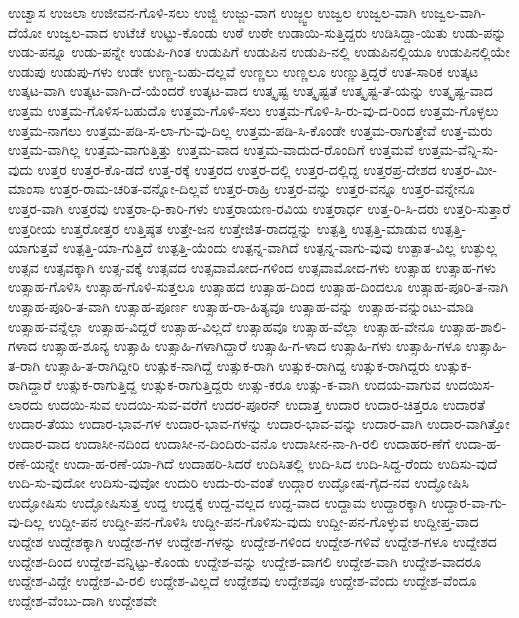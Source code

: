 {ಉಚ್ವಾಸ
ಉಜಲಾ
ಉಜೀವನ-ಗೊಳಿ-ಸಲು
ಉಜ್ಜಿ
ಉಜ್ಜು-ವಾಗ
ಉಜ್ಜ್ವಲ
ಉಜ್ವಲ
ಉಜ್ವಲ-ವಾಗಿ
ಉಜ್ವಲ-ವಾಗಿ-ದೆಯೋ
ಉಜ್ವಲ-ವಾದ
ಉಟೆಚೆ
ಉಟ್ಟು-ಕೊಂಡು
ಉಠೆ
ಉಠೇ
ಉಡಾಯಿ-ಸುತ್ತಿದ್ದರು
ಉಡಿಸಿದ್ದಾ-ಯಿತು
ಉಡು-ಪನ್ನು
ಉಡು-ಪನ್ನೂ
ಉಡು-ಪನ್ನೇ
ಉಡುಪಿ-ಗಿಂತ
ಉಡುಪಿಗೆ
ಉಡುಪಿನ
ಉಡುಪಿ-ನಲ್ಲಿ
ಉಡುಪಿನಲ್ಲಿಯೂ
ಉಡುಪಿನಲ್ಲಿಯೇ
ಉಡುಪು
ಉಡುಪು-ಗಳು
ಉಡೇ
ಉಣ್ಣ-ಬಹು-ದಲ್ಲವೆ
ಉಣ್ಣಲು
ಉಣ್ಣಲೂ
ಉಣ್ಣುತ್ತಿದ್ದರೆ
ಉತ-ಸಾರಿಕ
ಉತ್ಕಟ
ಉತ್ಕಟ-ವಾಗಿ
ಉತ್ಕಟ-ವಾಗಿ-ದೆ-ಯೆಂದರೆ
ಉತ್ಕಟ-ವಾದ
ಉತ್ಕೃಷ್ಟ
ಉತ್ಕೃಷ್ಟತೆ
ಉತ್ಕೃಷ್ಟ-ತೆ-ಯನ್ನು
ಉತ್ಕೃಷ್ಟ-ವಾದ
ಉತ್ತಮ
ಉತ್ತಮ-ಗೊಳಿಸ-ಬಹುದೊ
ಉತ್ತಮ-ಗೊಳಿ-ಸಲು
ಉತ್ತಮ-ಗೊಳಿ-ಸಿ-ರು-ವು-ದ-ರಿಂದ
ಉತ್ತಮ-ಗೊಳ್ಳಲು
ಉತ್ತಮ-ನಾಗಲು
ಉತ್ತಮ-ಪಡಿ-ಸ-ಲಾ-ಗು-ವು-ದಿಲ್ಲ
ಉತ್ತಮ-ಪಡಿ-ಸಿ-ಕೊಂಡೇ
ಉತ್ತಮ-ರಾಗುತ್ತೇವೆ
ಉತ್ತ-ಮರು
ಉತ್ತಮ-ವಾಗಿಲ್ಲ
ಉತ್ತಮ-ವಾಗುತ್ತಿತ್ತು
ಉತ್ತಮ-ವಾದ
ಉತ್ತಮ-ವಾದುದ-ರೊಂದಿಗೆ
ಉತ್ತಮವೆ
ಉತ್ತಮ-ವೆನ್ನಿ-ಸು-ವುದು
ಉತ್ತರ
ಉತ್ತರ-ಕೊ-ಡದೆ
ಉತ್ತ-ರಕ್ಕೆ
ಉತ್ತರದ
ಉತ್ತರ-ದಲ್ಲಿ
ಉತ್ತರ-ದಲ್ಲಿದ್ದ
ಉತ್ತರಪ್ರ-ದೇಶದ
ಉತ್ತರ-ಮೀ-ಮಾಂಸಾ
ಉತ್ತರ-ರಾಮ-ಚರಿತ-ವನ್ನೋ-ದಿಲ್ಲವೆ
ಉತ್ತರ-ರಾಹ್ರಿ
ಉತ್ತರ-ವನ್ನು
ಉತ್ತರ-ವನ್ನೂ
ಉತ್ತರ-ವನ್ನೇನೂ
ಉತ್ತರ-ವಾಗಿ
ಉತ್ತರವು
ಉತ್ತರಾ-ಧಿ-ಕಾರಿ-ಗಳು
ಉತ್ತರಾಯಣ-ರವಿಯ
ಉತ್ತರಾರ್ಧ
ಉತ್ತ-ರಿ-ಸಿ-ದರು
ಉತ್ತರಿ-ಸುತ್ತಾರೆ
ಉತ್ತರೀಯ
ಉತ್ತರೋತ್ತರ
ಉತ್ತಿಷ್ಠತ
ಉತ್ತೇ-ಜನ
ಉತ್ತೇಜಿತ-ರಾದದ್ದನ್ನು
ಉತ್ಪತ್ತಿ
ಉತ್ಪತ್ತಿ-ಮಾಡುವ
ಉತ್ಪತ್ತಿ-ಯಾಗುತ್ತವೆ
ಉತ್ಪತ್ತಿ-ಯಾ-ಗುತ್ತಿದೆ
ಉತ್ಪತ್ತಿ-ಯೆಂದು
ಉತ್ಪನ್ನ-ವಾಗಿದೆ
ಉತ್ಪನ್ನ-ವಾಗು-ವುವು
ಉತ್ಪಾತ-ವಿಲ್ಲ
ಉತ್ಫುಲ್ಲ
ಉತ್ಸವ
ಉತ್ಸವಕ್ಕಾಗಿ
ಉತ್ಸ-ವಕ್ಕೆ
ಉತ್ಸವದ
ಉತ್ಸವಾಮೋದ-ಗಳಿಂದ
ಉತ್ಸವಾಮೋದ-ಗಳು
ಉತ್ಸಾಹ
ಉತ್ಸಾಹ-ಗಳು
ಉತ್ಸಾಹ-ಗೊಳಿಸಿ
ಉತ್ಸಾಹ-ಗೊಳಿ-ಸುತ್ತಲೂ
ಉತ್ಸಾಹದ
ಉತ್ಸಾಹ-ದಿಂದ
ಉತ್ಸಾಹ-ದಿಂದಲೂ
ಉತ್ಸಾಹ-ಪೂರಿ-ತ-ನಾಗಿ
ಉತ್ಸಾಹ-ಪೂರಿ-ತ-ವಾಗಿ
ಉತ್ಸಾಹ-ಪೂರ್ಣ
ಉತ್ಸಾಹ-ರಾ-ಹಿತ್ಯವೂ
ಉತ್ಸಾಹ-ವನ್ನು
ಉತ್ಸಾಹ-ವನ್ನುಂಟು-ಮಾಡಿ
ಉತ್ಸಾಹ-ವನ್ನೆಲ್ಲಾ
ಉತ್ಸಾಹ-ವಿದ್ದರೆ
ಉತ್ಸಾಹ-ವಿಲ್ಲದೆ
ಉತ್ಸಾಹವೂ
ಉತ್ಸಾಹ-ವೆಲ್ಲಾ
ಉತ್ಸಾಹ-ವೇನೂ
ಉತ್ಸಾಹ-ಶಾಲಿ-ಗಳಾದ
ಉತ್ಸಾಹ-ಶೂನ್ಯ
ಉತ್ಸಾಹಿ
ಉತ್ಸಾಹಿ-ಗಳಾಗಿದ್ದಾರೆ
ಉತ್ಸಾಹಿ-ಗ-ಳಾದ
ಉತ್ಸಾಹಿ-ಗಳು
ಉತ್ಸಾಹಿ-ಗಳೂ
ಉತ್ಸಾಹಿ-ತ-ರಾಗಿ
ಉತ್ಸಾಹಿ-ತ-ರಾಗಿದ್ದೀರಿ
ಉತ್ಸುಕ-ನಾಗಿದ್ದೆ
ಉತ್ಸುಕ-ರಾಗಿ
ಉತ್ಸುಕ-ರಾಗಿದ್ದ
ಉತ್ಸುಕ-ರಾಗಿದ್ದರು
ಉತ್ಸುಕ-ರಾಗಿದ್ದಾರೆ
ಉತ್ಸುಕ-ರಾಗುತ್ತಿದ್ದ
ಉತ್ಸುಕ-ರಾಗುತ್ತಿದ್ದರು
ಉತ್ಸು-ಕರೂ
ಉತ್ಸು-ಕ-ವಾಗಿ
ಉದಯ-ವಾಗುವ
ಉದಯಿಸ-ಲಾರದು
ಉದಯಿ-ಸುವ
ಉದಯಿ-ಸುವ-ವರೆಗೆ
ಉದರ-ಪೂರನ್
ಉದಾತ್ತ
ಉದಾರ
ಉದಾರ-ಚಿತ್ತರೂ
ಉದಾರತೆ
ಉದಾರ-ತೆಯು
ಉದಾರ-ಭಾವ-ಗಳ
ಉದಾರ-ಭಾವ-ಗಳನ್ನು
ಉದಾರ-ಭಾವ-ವನ್ನು
ಉದಾರ-ವಾಗಿ
ಉದಾರ-ವಾಗಿತ್ತೋ
ಉದಾರ-ವಾದ
ಉದಾಸೀ-ನದಿಂದ
ಉದಾಸೀ-ನ-ದಿಂದಿರು-ವನೊ
ಉದಾಸೀನ-ನಾ-ಗಿ-ರಲಿ
ಉದಾಹರ-ಣೆಗೆ
ಉದಾ-ಹ-ರಣೆ-ಯನ್ನೇ
ಉದಾ-ಹ-ರಣೆ-ಯಾ-ಗಿದೆ
ಉದಾಹರಿ-ಸಿದರೆ
ಉದಿಸಿತಲ್ಲಿ
ಉದಿ-ಸಿದ
ಉದಿ-ಸಿದ್ದ-ರೆಂದು
ಉದಿಸು-ವುದೆ
ಉದಿ-ಸು-ವುದೋ
ಉದಿಸು-ವುವೋ
ಉದುರಿ
ಉದು-ರು-ವಂತೆ
ಉದ್ಗಾರ
ಉದ್ಘೋಷ-ಗೈದ-ನವ
ಉದ್ಘೋಷಿಸಿ
ಉದ್ಘೋಷಿಸು
ಉದ್ಘೋಷಿಸುತ್ತ
ಉದ್ದ
ಉದ್ದಕ್ಕೆ
ಉದ್ದ-ವಲ್ಲದ
ಉದ್ದ-ವಾದ
ಉದ್ದಾಮ
ಉದ್ದಾರಕ್ಕಾಗಿ
ಉದ್ದಾರ-ವಾ-ಗು-ವು-ದಿಲ್ಲ
ಉದ್ದೀ-ಪನ
ಉದ್ದೀ-ಪನ-ಗೊಳಿಸಿ
ಉದ್ದೀ-ಪನ-ಗೊಳಿಸು-ವುದು
ಉದ್ದೀ-ಪನ-ಗೊಳ್ಳುವ
ಉದ್ದೀಪ್ತ-ವಾದ
ಉದ್ದೇಶ
ಉದ್ದೇಶಕ್ಕಾಗಿ
ಉದ್ದೇಶ-ಗಳ
ಉದ್ದೇಶ-ಗಳನ್ನು
ಉದ್ದೇಶ-ಗಳಿಂದ
ಉದ್ದೇಶ-ಗಳಿವೆ
ಉದ್ದೇಶ-ಗಳೂ
ಉದ್ದೇಶದ
ಉದ್ದೇಶ-ದಿಂದ
ಉದ್ದೇಶ-ವನ್ನಿಟ್ಟು-ಕೊಂಡು
ಉದ್ದೇಶ-ವನ್ನು
ಉದ್ದೇಶ-ವಾಗಲಿ
ಉದ್ದೇಶ-ವಾಗಿ
ಉದ್ದೇಶ-ವಾದರೂ
ಉದ್ದೇಶ-ವಿದ್ದೇ
ಉದ್ದೇಶ-ವಿ-ರಲಿ
ಉದ್ದೇಶ-ವಿಲ್ಲದೆ
ಉದ್ದೇಶವು
ಉದ್ದೇಶವೂ
ಉದ್ದೇಶ-ವೆಂದು
ಉದ್ದೇಶ-ವೆಂದೂ
ಉದ್ದೇಶ-ವೆಂಬು-ದಾಗಿ
ಉದ್ದೇಶವೇ
}
